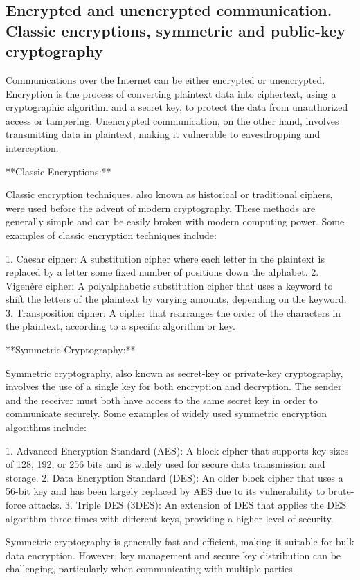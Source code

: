 \documentclass{article}
\begin{document}
\subsection{Encrypted and unencrypted communication. Classic encryptions, symmetric and public-key cryptography}

Communications over the Internet can be either encrypted or unencrypted. Encryption is the process of converting plaintext data into ciphertext, using a cryptographic algorithm and a secret key, to protect the data from unauthorized access or tampering. Unencrypted communication, on the other hand, involves transmitting data in plaintext, making it vulnerable to eavesdropping and interception.

**Classic Encryptions:**

Classic encryption techniques, also known as historical or traditional ciphers, were used before the advent of modern cryptography. These methods are generally simple and can be easily broken with modern computing power. Some examples of classic encryption techniques include:

1. Caesar cipher: A substitution cipher where each letter in the plaintext is replaced by a letter some fixed number of positions down the alphabet.
2. Vigenère cipher: A polyalphabetic substitution cipher that uses a keyword to shift the letters of the plaintext by varying amounts, depending on the keyword.
3. Transposition cipher: A cipher that rearranges the order of the characters in the plaintext, according to a specific algorithm or key.

**Symmetric Cryptography:**

Symmetric cryptography, also known as secret-key or private-key cryptography, involves the use of a single key for both encryption and decryption. The sender and the receiver must both have access to the same secret key in order to communicate securely. Some examples of widely used symmetric encryption algorithms include:

1. Advanced Encryption Standard (AES): A block cipher that supports key sizes of 128, 192, or 256 bits and is widely used for secure data transmission and storage.
2. Data Encryption Standard (DES): An older block cipher that uses a 56-bit key and has been largely replaced by AES due to its vulnerability to brute-force attacks.
3. Triple DES (3DES): An extension of DES that applies the DES algorithm three times with different keys, providing a higher level of security.

Symmetric cryptography is generally fast and efficient, making it suitable for bulk data encryption. However, key management and secure key distribution can be challenging, particularly when communicating with multiple parties.
\end{document}

